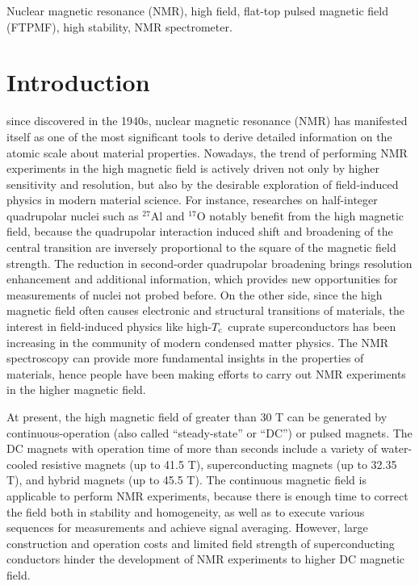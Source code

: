 \documentclass[lettersize,journal]{IEEEtran}
\begin{document}
\begin{IEEEkeywords}
Nuclear magnetic resonance (NMR), high field, flat-top pulsed magnetic field (FTPMF), high stability, NMR spectrometer.
\end{IEEEkeywords}

\section{Introduction}
 since discovered in the 1940s, nuclear magnetic resonance (NMR) has manifested itself as one of the most significant tools to derive detailed information on the atomic scale about material properties. Nowadays, the trend of performing NMR experiments in the high magnetic field is actively driven not only by higher sensitivity and resolution, but also by the desirable exploration of ﬁeld-induced physics in modern material science\cite{ref1,ref2,ref3,ref4,ref5,ref6,ref7,ref8,ref9,ref10,ref11,ref12,ref13,ref14,ref15,ref16,ref17,ref18}. For instance, researches on half-integer quadrupolar nuclei such as $^{27}$Al and $^{17}$O notably benefit from the high magnetic field, because the quadrupolar interaction induced shift and broadening of the central transition are inversely proportional to the square of the magnetic field strength. The reduction in second-order quadrupolar broadening brings resolution enhancement and additional information, which provides new opportunities for measurements of nuclei not probed before\cite{ref1,ref2,ref3,ref4,ref5,ref8,ref10}. On the other side, since the high magnetic field often causes electronic and structural transitions of materials, the interest in field-induced physics like high-$T_{\rm c}$ cuprate superconductors has been increasing in the community of modern condensed matter physics. The NMR spectroscopy can provide more fundamental insights in the properties of materials, hence people have been making efforts to carry out NMR experiments in the higher magnetic field\cite{ref6,ref7,ref9,ref11,ref12,ref13,ref14,ref15,ref16,ref17,ref18}.

At present, the high magnetic field of greater than 30 T can be generated by continuous-operation (also called “steady-state” or “DC”) or pulsed magnets. The DC magnets with operation time of more than seconds include a variety of water-cooled resistive magnets (up to 41.5 T\cite{ref19}), superconducting magnets (up to 32.35 T\cite{ref20}), and hybrid magnets (up to 45.5 T\cite{ref21}). The continuous magnetic field is applicable to perform NMR experiments, because there is enough time to correct the field both in stability and homogeneity, as well as to execute various sequences for measurements and achieve signal averaging. However, large construction and operation costs and limited field strength of superconducting conductors hinder the development of NMR experiments to higher DC magnetic field.
\end{document}
